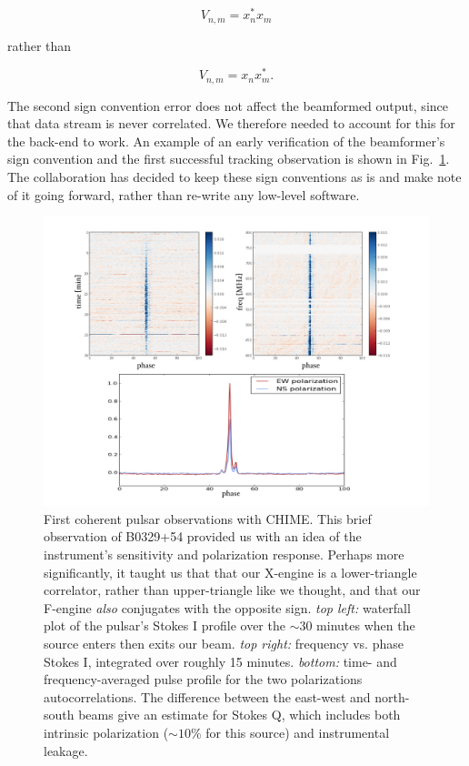 \begin{equation}
V_{n, m} = x_n^* x_m
\end{equation}

\noindent rather than 

\begin{equation}
V_{n, m} = x_n x_m^*.
\end{equation}

The second sign convention error does not affect the beamformed 
output, since that data stream is never correlated. We therefore 
needed to account for this for the back-end to work. An example 
of an early verification of the beamformer's sign convention 
and the first successful tracking observation is shown in Fig.~\ref{fig-bf_b0329}. 
The collaboration has decided to keep these sign conventions as is
and make note of it going forward, rather than re-write any low-level 
software.


\begin{figure}[!h]
\label{fig-bf_b0329}
\begin{center}
\includegraphics[trim={0.8in, 0in, 0in, 0in}, scale=0.5]{./figures/beamforming/b0329_testing.jpeg}
\caption[abc]{First coherent pulsar observations with CHIME. This 
brief observation of B0329+54 provided us with an idea 
of the instrument's sensitivity and polarization response. 
Perhaps more significantly, it taught us that 
that our X-engine is a lower-triangle correlator, rather than 
upper-triangle like we thought, and that our F-engine \textit{also}
conjugates with the opposite sign. \textit{top left:} waterfall plot
of the pulsar's Stokes I profile over the $\sim$30 minutes when the 
source enters then exits our beam. \textit{top right:} frequency 
vs. phase Stokes I, integrated over roughly 15 minutes. 
\textit{bottom:} time- and frequency-averaged pulse profile 
for the two polarizations autocorrelations. The difference between 
the east-west and north-south beams give an estimate for Stokes Q, which 
includes both intrinsic polarization ($\sim10\%$ for this source)
and instrumental leakage.} 
\vspace{0.4cm}   
\end{center}
\end{figure}


